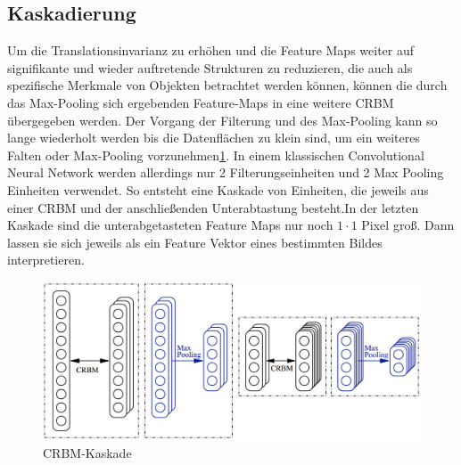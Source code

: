 \subsection{Kaskadierung}
Um die Translationsinvarianz zu erhöhen und die Feature Maps weiter auf signifikante und wieder auftretende Strukturen zu reduzieren, die auch als spezifische Merkmale von Objekten betrachtet werden können, können die durch das Max-Pooling sich ergebenden Feature-Maps in eine weitere CRBM übergegeben werden. 
Der Vorgang der Filterung und des Max-Pooling kann so lange wiederholt werden bis die Datenflächen zu klein sind, um ein weiteres Falten oder Max-Pooling vorzunehmen\ref{cascade}. In einem klassischen Convolutional Neural Network werden allerdings nur 2 Filterungseinheiten und 2 Max Pooling Einheiten verwendet. So entsteht eine Kaskade von Einheiten, die jeweils aus einer CRBM und der anschließenden Unterabtastung besteht.\newline In der letzten Kaskade sind die unterabgetasteten Feature Maps nur noch $1 \cdot 1$ Pixel groß. Dann lassen sie sich jeweils als ein Feature Vektor eines bestimmten Bildes interpretieren.\newline
\begin{figure}[]
                \centering
                \includegraphics[width=2.0\columnwidth]{images/stack.jpg}
                \caption{CRBM-Kaskade \cite{Norouzi09}}
                \label{cascade}
\end{figure}
